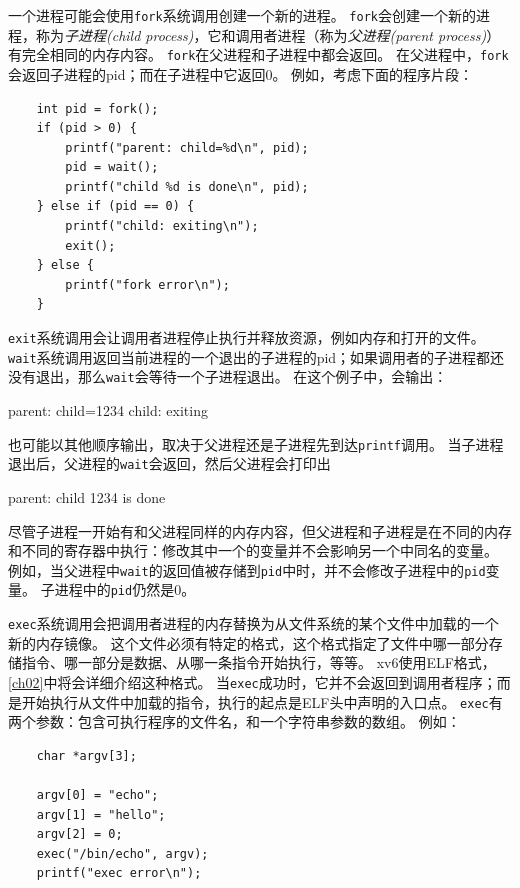 一个进程可能会使用\texttt{fork}系统调用创建一个新的进程。
\texttt{fork}会创建一个新的进程，称为\emph{子进程(child process)}，它和调用者进程（称为\emph{父进程(parent process)}）有完全相同的内存内容。
\texttt{fork}在父进程和子进程中都会返回。
在父进程中，\texttt{fork}会返回子进程的pid；而在子进程中它返回0。
例如，考虑下面的程序片段：

\begin{lstlisting}
    int pid = fork();
    if (pid > 0) {
        printf("parent: child=%d\n", pid);
        pid = wait();
        printf("child %d is done\n", pid);
    } else if (pid == 0) {
        printf("child: exiting\n");
        exit();
    } else {
        printf("fork error\n");
    }
\end{lstlisting}

\texttt{exit}系统调用会让调用者进程停止执行并释放资源，例如内存和打开的文件。
\texttt{wait}系统调用返回当前进程的一个退出的子进程的pid；如果调用者的子进程都还没有退出，那么\texttt{wait}会等待一个子进程退出。
在这个例子中，会输出：
\begin{blacklisting}
    parent: child=1234
    child: exiting
\end{blacklisting}    

也可能以其他顺序输出，取决于父进程还是子进程先到达\texttt{printf}调用。
当子进程退出后，父进程的\texttt{wait}会返回，然后父进程会打印出
\begin{blacklisting}
    parent: child 1234 is done
\end{blacklisting}

尽管子进程一开始有和父进程同样的内存内容，但父进程和子进程是在不同的内存和不同的寄存器中执行：修改其中一个的变量并不会影响另一个中同名的变量。
例如，当父进程中\texttt{wait}的返回值被存储到\texttt{pid}中时，并不会修改子进程中的\texttt{pid}变量。
子进程中的\texttt{pid}仍然是0。

\texttt{exec}系统调用会把调用者进程的内存替换为从文件系统的某个文件中加载的一个新的内存镜像。
这个文件必须有特定的格式，这个格式指定了文件中哪一部分存储指令、哪一部分是数据、从哪一条指令开始执行，等等。
xv6使用ELF格式，\autoref{ch02}中将会详细介绍这种格式。
当\texttt{exec}成功时，它并不会返回到调用者程序；而是开始执行从文件中加载的指令，执行的起点是ELF头中声明的入口点。
\texttt{exec}有两个参数：包含可执行程序的文件名，和一个字符串参数的数组。
例如：
\begin{lstlisting}
    char *argv[3];

    argv[0] = "echo";
    argv[1] = "hello";
    argv[2] = 0;
    exec("/bin/echo", argv);
    printf("exec error\n");
\end{lstlisting}

